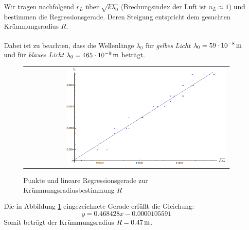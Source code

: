 \documentclass[a4paper,titlepage]{scrartcl}
\numberwithin{equation}{section}
\begin{document}
Wir tragen nachfolgend $r_L$ über $\sqrt{k \lambda_0}$ (Brechungsindex der Luft ist $n_L \approx 1$)  und bestimmen die Regressionsgerade. Deren Steigung entspricht dem gesuchten Krümmungsradius $R$.\\ \\
Dabei ist zu beachten, dass die Wellenlänge $\lambda_0$ für \emph{gelbes Licht} $\lambda_0=\unit[59 \cdot 10^{-8}]{m}$ und für \emph{blaues Licht} $\lambda_0=\unit[465 \cdot 10^{-9}]{m}$ beträgt.
\begin{figure}[H]
	\centering
	\begin{tabular}{@{}r@{}}
		\includegraphics[width=0.8\textwidth]{bilder/aufgabe11.png}\\
	\end{tabular}
	\caption{Punkte und lineare Regressionsgerade zur Krümmungsradiusbestimmung $R$}
	\label{fig:aufgabe11}
\end{figure}
Die in Abbildung \ref{fig:aufgabe11} eingezeichnete Gerade erfüllt die Gleichung:
\begin{equation*}
y=0.468428x-0.0000105591
\end{equation*}
Somit beträgt der Krümmungsradius $R=\unit[0.47]{m}$.
\end{document}
